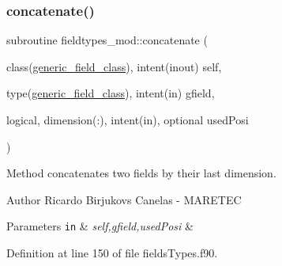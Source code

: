 \subsubsection{\texorpdfstring{concatenate()}{concatenate()}}
{\footnotesize\ttfamily subroutine fieldtypes\+\_\+mod\+::concatenate (\begin{DoxyParamCaption}\item[{class(\mbox{\hyperlink{structfieldtypes__mod_1_1generic__field__class}{generic\+\_\+field\+\_\+class}}), intent(inout)}]{self,  }\item[{type(\mbox{\hyperlink{structfieldtypes__mod_1_1generic__field__class}{generic\+\_\+field\+\_\+class}}), intent(in)}]{gfield,  }\item[{logical, dimension(\+:), intent(in), optional}]{used\+Posi }\end{DoxyParamCaption})\hspace{0.3cm}{\ttfamily [private]}}



Method concatenates two fields by their last dimension. 

\begin{DoxyAuthor}{Author}
Ricardo Birjukovs Canelas -\/ M\+A\+R\+E\+T\+EC 
\end{DoxyAuthor}

\begin{DoxyParams}[1]{Parameters}
\mbox{\tt in}  & {\em self,gfield,used\+Posi} & \\
\hline
\end{DoxyParams}


Definition at line 150 of file fields\+Types.\+f90.


